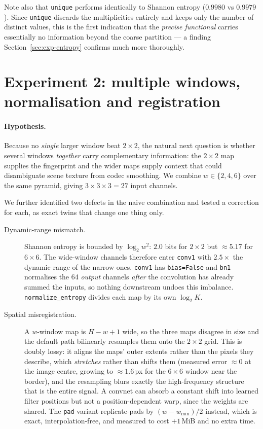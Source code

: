 Note also that \texttt{unique} performs identically to Shannon entropy
($0.9980$ vs $0.9979$). Since \texttt{unique} discards the multiplicities
entirely and keeps only the number of distinct values, this is the first
indication that the \emph{precise functional} carries essentially no
information beyond the coarse partition --- a finding Section~\ref{sec:exp-entropy}
confirms much more thoroughly.

\section{Experiment 2: multiple windows, normalisation and registration}
\label{sec:exp-multiwindow}

\paragraph{Hypothesis.} Because no \emph{single} larger window beat $2\times2$,
the natural next question is whether several windows \emph{together} carry
complementary information: the $2\times2$ map supplies the fingerprint and the
wider maps supply context that could disambiguate scene texture from codec
smoothing. We combine $w \in \{2,4,6\}$ over the same pyramid, giving
$3 \times 3 \times 3 = 27$ input channels.

We further identified two defects in the naive combination and tested a
correction for each, as exact twins that change one thing only.

\begin{description}
  \item[Dynamic-range mismatch.] Shannon entropy is bounded by $\log_2 w^2$:
    $2.0$ bits for $2\times2$ but $\approx5.17$ for $6\times6$. The wide-window
    channels therefore enter \texttt{conv1} with $2.5\times$ the dynamic range of
    the narrow ones. \texttt{conv1} has \texttt{bias=False} and \texttt{bn1}
    normalises the 64 \emph{output} channels \emph{after} the convolution has
    already summed the inputs, so nothing downstream undoes this imbalance.
    \texttt{normalize\_entropy} divides each map by its own $\log_2 K$.
  \item[Spatial misregistration.] A $w$-window map is $H-w+1$ wide, so the three
    maps disagree in size and the default path bilinearly resamples them onto the
    $2\times2$ grid. This is doubly lossy: it aligns the maps' outer extents
    rather than the pixels they describe, which \emph{stretches} rather than
    shifts them (measured error $\approx0$ at the image centre, growing to
    $\approx1.6$\,px for the $6\times6$ window near the border), and the
    resampling blurs exactly the high-frequency structure that is the entire
    signal. A convnet can absorb a constant shift into learned filter positions
    but not a position-dependent warp, since the weights are shared. The
    \texttt{pad} variant replicate-pads by $(w-w_{\min})/2$ instead, which is
    exact, interpolation-free, and measured to cost $+1$\,MiB and no extra time.
\end{description}

